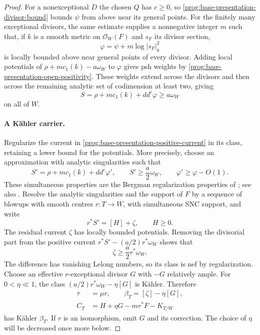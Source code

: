 \begin{proof}
For a nonexceptional $D$ the chosen $Q$ has $c\geq0$, so
\eqref{prog:base-presentation-divisor-bound} bounds $\psi$ from above
near its general points. For the finitely many exceptional divisors,
the same estimate supplies a nonnegative integer $m$ such that, if
$k$ is a smooth metric on $\mathcal O_W(F)$ and $s_F$ its divisor
section,
\[
 \varphi=\psi+m\log|s_F|_k^2
\]
is locally bounded above near general points of every divisor.
Adding local potentials of $\rho+m c_1(k)-a\omega_W$ to
$\varphi$ gives psh weights by
\eqref{prog:base-presentation-open-positivity}. These weights
extend across the divisors and then across the remaining analytic
set of codimension at least two, giving
\begin{equation}\label{prog:base-presentation-positive-current}
 S=\rho+m c_1(k)+dd^c\varphi\geq a\omega_W
\end{equation}
on all of $W$.

\paragraph{A K\"ahler carrier.}
Regularize the current in
\eqref{prog:base-presentation-positive-current} in its class, retaining
a lower bound for the potentials. More precisely, choose an
approximation with analytic singularities such that
\begin{equation}\label{prog:base-presentation-regularization}
 S'=\rho+m c_1(k)+dd^c\varphi',\qquad
 S'\geq\frac a2\omega_W,\qquad
 \varphi'\geq\varphi-O(1).
\end{equation}
These simultaneous properties are the Bergman regularization
properties of \cite{DemaillyRegularization1992}; see also
\cite[pp.~59--60]{PopoviciRegularization2004}.
Resolve the analytic singularities and the support of $F$ by a
sequence of blowups with smooth centres $r:T\to W$, with simultaneous
SNC support, and write
\[
 r^*S'=[H]+\zeta,\qquad H\geq0.
\]
The residual current $\zeta$ has locally bounded potentials. Removing
the divisorial part from the positive current
$r^*S'-(a/2)r^*\omega_W$ shows that
\[
 \zeta\geq\frac a2r^*\omega_W.
\]
The difference has vanishing Lelong numbers, so its class is nef by
regularization. Choose an effective $r$-exceptional divisor $G$ with
$-G$ relatively ample. For $0<\eta\ll1$, the class
$(a/2)r^*\omega_W-\eta[G]$ is K\"ahler. Therefore
\begin{equation}\label{prog:base-presentation-carrier-data}
 \begin{split}
 \tau&=\mu r,\qquad
 \beta_T=[\zeta]-\eta[G],\\
 C_T&=H+\eta G-mr^*F-K_{T/W}
 \end{split}
\end{equation}
has K\"ahler $\beta_T$. If $r$ is an isomorphism, omit $G$ and its
correction. The choice of $\eta$ will be decreased once more below.


\end{proof}
